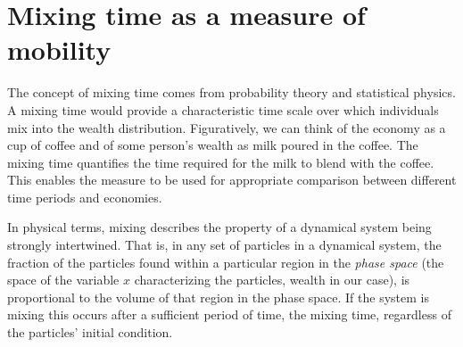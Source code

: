 \documentclass[11pt]{article}
\numberwithin{equation}{section}
\begin{document}

\FloatBarrier
\section{Mixing time as a measure of mobility}
\label{sec:mixing-time}

The concept of mixing time comes from probability theory and statistical physics. A mixing time would provide a characteristic time scale over which individuals mix into the wealth distribution. Figuratively, we can think of the economy as a cup of coffee and of some person's wealth as milk poured in the coffee. The mixing time quantifies the time required for the milk to blend with the coffee. This enables the measure to be used for appropriate comparison between different time periods and economies.

In physical terms, mixing describes the property of a dynamical system being strongly intertwined. That is, in any set of particles in a dynamical system, the fraction of the particles found within a particular region in the \textit{phase space} (the space of the variable $x$ characterizing the particles, wealth in our case), is proportional to the volume of that region in the phase space. If the system is mixing this occurs after a sufficient period of time, the mixing time, regardless of the particles' initial condition.

\end{document}
